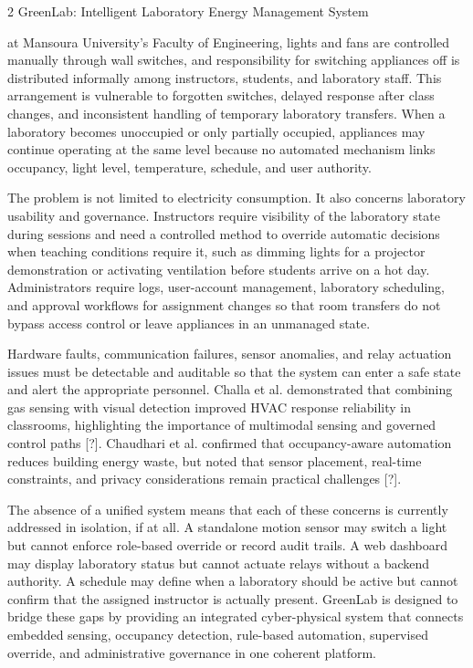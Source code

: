 2
GreenLab: Intelligent Laboratory Energy Management System


at Mansoura University's Faculty of Engineering, lights and fans are controlled manually
through wall switches, and responsibility for switching appliances off is distributed informally among instructors, students, and laboratory staff. This arrangement is vulnerable
to forgotten switches, delayed response after class changes, and inconsistent handling of
temporary laboratory transfers. When a laboratory becomes unoccupied or only partially
occupied, appliances may continue operating at the same level because no automated mechanism links occupancy, light level, temperature, schedule, and user authority.

The problem is not limited to electricity consumption. It also concerns laboratory usability and governance. Instructors require visibility of the laboratory state during sessions
and need a controlled method to override automatic decisions when teaching conditions
require it, such as dimming lights for a projector demonstration or activating ventilation
before students arrive on a hot day. Administrators require logs, user-account management, laboratory scheduling, and approval workﬂows for assignment changes so that room
transfers do not bypass access control or leave appliances in an unmanaged state.

Hardware faults, communication failures, sensor anomalies, and relay actuation issues must be detectable and auditable so that the system can enter a safe state and alert the
appropriate personnel. Challa et al. demonstrated that combining gas sensing with visual
detection improved HVAC response reliability in classrooms, highlighting the importance
of multimodal sensing and governed control paths [?]. Chaudhari et al. conﬁrmed that
occupancy-aware automation reduces building energy waste, but noted that sensor placement, real-time constraints, and privacy considerations remain practical challenges [?].

The absence of a uniﬁed system means that each of these concerns is currently addressed in isolation, if at all. A standalone motion sensor may switch a light but cannot
enforce role-based override or record audit trails. A web dashboard may display laboratory status but cannot actuate relays without a backend authority. A schedule may deﬁne when a laboratory should be active but cannot conﬁrm that the assigned instructor is
actually present. GreenLab is designed to bridge these gaps by providing an integrated
cyber-physical system that connects embedded sensing, occupancy detection, rule-based
automation, supervised override, and administrative governance in one coherent platform.





